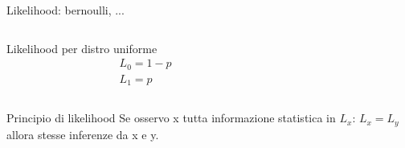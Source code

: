 \begin{frame}{Likelihood: bernoulli, ...}
\begin{columns}[T]
\begin{column}{0.5\textwidth}
    \begin{block}{Likelihood per distro uniforme}
\begin{align*}
&L_0=1-p\\
&L_1=p
\end{align*}
\end{block}
\end{column}
\begin{column}{0.5\textwidth}

\end{column}
\end{columns}
\end{frame}

\begin{frame}{Principio di likelihood}
    Se osservo x tutta informazione statistica in $L_x$: $L_x=L_y$ allora stesse inferenze da x e y.
\end{frame}